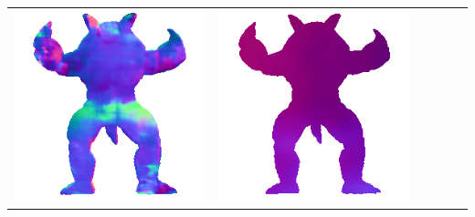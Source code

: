 \begin{tabularx}{\linewidth}{@{}Y@{}Y@{}Y@{}Y@{}Y@{}Y@{}}
\includegraphics[width=\linewidth]{semisynthetic/20150514_22_marrnet_out.png} &
\includegraphics[width=\linewidth]{semisynthetic/20150514_22_ef_out.png} \\

\end{tabularx}
